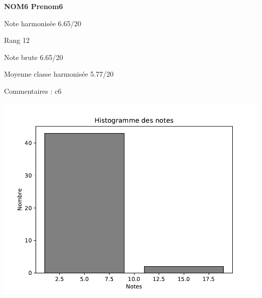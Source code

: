\begin{minipage}[c]{.45\linewidth} 
\Large \textbf{\textsf{NOM6 Prenom6}} 
 
 \normalsize Note harmonisée 6.65/20 
 
Rang 12
 
Note brute 6.65/20 
 
Moyenne classe harmonisée 5.77/20 
 
Commentaires : 
c6 
\end{minipage}\hfill 
\begin{minipage}[c]{.45\linewidth}  
\begin{center}
\includegraphics[width=.8\linewidth]{../histo.pdf} 
\end{center}
\end{minipage}
\footnotesize 
